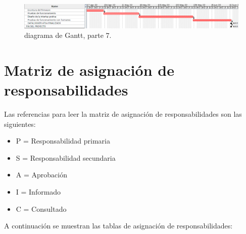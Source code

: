 \documentclass[
12pt,
spanish,
singlespacing,
parskip,
headsepline,]{article}
\begin{document}
\begin{figure}[H]
	\centering
	\includegraphics[width=\textwidth]{Figuras/gantt07.png}
	\caption{diagrama de Gantt, parte 7.}
	\label{fig:gantt7}
\end{figure}

\section{Matriz de asignación de responsabilidades}

Las referencias para leer la matriz de asignación de responsabilidades son las siguientes:

\begin{itemize}
	\item P = Responsabilidad primaria
	\item S = Responsabilidad secundaria
	\item A = Aprobación
	\item I = Informado
	\item C = Consultado
\end{itemize}

A continuación se muestran las tablas de asignación de responsabilidades:
\end{document}

